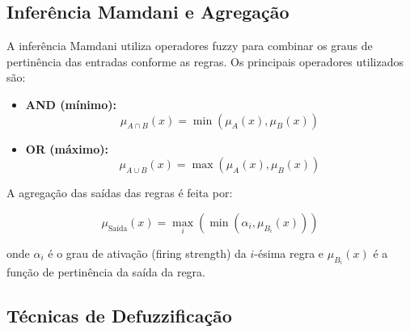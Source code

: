 


\subsection{Inferência Mamdani e Agregação}

A inferência Mamdani utiliza operadores fuzzy para combinar os graus de pertinência das entradas conforme as regras. Os principais operadores utilizados são:

\begin{itemize}
    \item \textbf{AND (mínimo):}
    \begin{equation}
        \mu_{A \cap B}(x) = \min\left(\mu_A(x), \mu_B(x)\right)
    \end{equation}
    \item \textbf{OR (máximo):}
    \begin{equation}
        \mu_{A \cup B}(x) = \max\left(\mu_A(x), \mu_B(x)\right)
    \end{equation}
\end{itemize}

A agregação das saídas das regras é feita por:

\begin{equation}
\mu_{\text{Saída}}(x) = \max_{i} \left( \min\left(\alpha_i, \mu_{B_i}(x)\right) \right)
\end{equation}

onde $\alpha_i$ é o grau de ativação (firing strength) da $i$-ésima regra e $\mu_{B_i}(x)$ é a função de pertinência da saída da regra.

\subsection{Técnicas de Defuzzificação}


